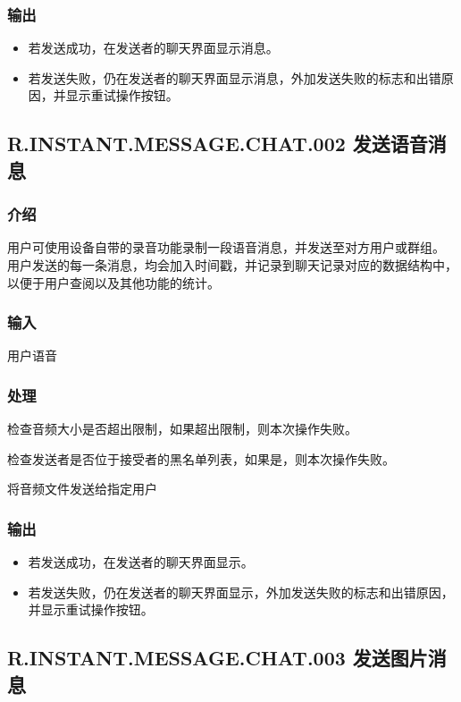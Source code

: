 \subsubsection{输出}
\begin{itemize}
	\item 若发送成功，在{\color{red}发送者的}聊天界面显示消息。
	\item 若发送失败，仍在{\color{red}发送者的}聊天界面显示消息，外加发送失败的标志和出错原因，并显示重试操作按钮。
	\end{itemize}
	

\subsection{R.INSTANT.MESSAGE.CHAT.002 发送语音消息}
\subsubsection{介绍}
用户可使用设备自带的录音功能录制一段语音消息，并发送至对方用户或群组。
{
	\color{red}
	用户发送的每一条消息，均会加入时间戳，并记录到聊天记录对应的数据结构中，以便于用户查阅以及其他功能的统计。
}
\subsubsection{输入}
用户语音
\subsubsection{处理}
\begin{enumerate}
	\item 检查音频大小是否超出限制，如果超出限制，则本次操作失败。
	{
		\color{red}
		\item 检查发送者是否位于接受者的黑名单列表，如果是，则本次操作失败。
	}
	\item 将音频文件发送给指定用户
	\end{enumerate}
\subsubsection{输出}
\begin{itemize}
	\item 若发送成功，在{\color{red}发送者的}聊天界面显示。
	\item 若发送失败，仍在{\color{red}发送者的}聊天界面显示，外加发送失败的标志和出错原因，并显示重试操作按钮。
	\end{itemize}

	
\subsection{R.INSTANT.MESSAGE.CHAT.003 发送图片消息}
